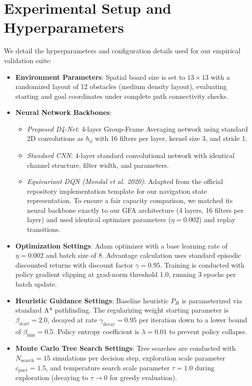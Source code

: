 \documentclass{article}
\begin{document}
\section{Experimental Setup and Hyperparameters}\label{app:hyperparameters}
We detail the hyperparameters and configuration details used for our empirical validation suite:
\begin{itemize}
    \item \textbf{Environment Parameters}: Spatial board size is set to $13 \times 13$ with a randomized layout of 12 obstacles (medium density layout), evaluating starting and goal coordinates under complete path connectivity checks.
    \item \textbf{Neural Network Backbones}:
    \begin{itemize}
        \item \emph{Proposed D4-Net}: 4-layer Group-Frame Averaging network using standard 2D convolutions as $h_\phi$ with 16 filters per layer, kernel size 3, and stride 1.
        \item \emph{Standard CNN}: 4-layer standard convolutional network with identical channel structure, filter width, and parameters.
        \item \emph{Equivariant DQN (Mondal et al. 2020)}: Adapted from the official repository implementation template for our navigation state representation. To ensure a fair capacity comparison, we matched its neural backbone exactly to our GFA architecture (4 layers, 16 filters per layer) and used identical optimizer parameters ($\eta = 0.002$) and replay transitions.
    \end{itemize}
    \item \textbf{Optimization Settings}: Adam optimizer with a base learning rate of $\eta = 0.002$ and batch size of 8. Advantage calculation uses standard episodic discounted returns with discount factor $\gamma = 0.95$. Training is conducted with policy gradient clipping at grad-norm threshold 1.0, running 3 epochs per batch update.
    \item \textbf{Heuristic Guidance Settings}: Baseline heuristic $P_H$ is parameterized via standard A* pathfinding. The regularizing weight starting parameter is $\beta_{\mathrm{start}} = 2.0$, decayed at rate $\gamma_{\mathrm{decay}} = 0.95$ per iteration down to a lower bound of $\beta_{\min} = 0.5$. Policy entropy coefficient is $\lambda = 0.01$ to prevent policy collapse.
    \item \textbf{Monte Carlo Tree Search Settings}: Tree searches are conducted with $N_{\mathrm{search}} = 15$ simulations per decision step, exploration scale parameter $c_{\mathrm{puct}} = 1.5$, and temperature search scale parameter $\tau = 1.0$ during exploration (decaying to $\tau \to 0$ for greedy evaluation).
\end{itemize}
\end{document}
